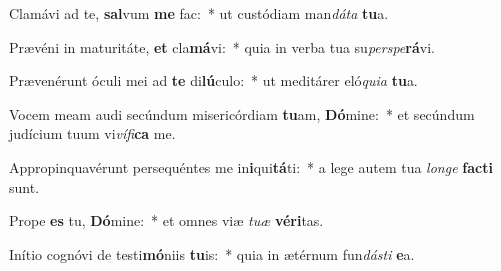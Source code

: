 \item Clamávi ad te, \textbf{sal}vum \textbf{me} fac:~* ut custódiam man\textit{dá}\textit{ta} \textbf{tu}a.
\item Prævéni in maturitáte, \textbf{et} cla\textbf{má}vi:~* quia in verba tua su\textit{per}\textit{spe}\textbf{rá}vi.
\item Prævenérunt óculi mei ad \textbf{te} di\textbf{lú}culo:~* ut meditárer eló\textit{qui}\textit{a} \textbf{tu}a.
\item Vocem meam audi secúndum misericórdiam \textbf{tu}am, \textbf{Dó}mine:~* et secúndum judícium tuum vi\textit{ví}\textit{fi}\textbf{ca} me.
\item Appropinquavérunt persequéntes me in\textbf{i}qui\textbf{tá}ti:~* a lege autem tua \textit{lon}\textit{ge} \textbf{fac}\textbf{ti} sunt.
\item Prope \textbf{es} tu, \textbf{Dó}mine:~* et omnes viæ \textit{tu}\textit{æ} \textbf{vé}\textbf{ri}tas.
\item Inítio cognóvi de testi\textbf{mó}niis \textbf{tu}is:~* quia in ætérnum fun\textit{dás}\textit{ti} \textbf{e}a.
